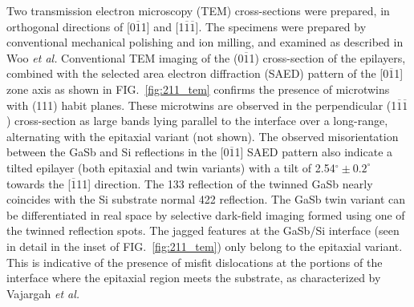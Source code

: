 Two transmission electron microscopy (TEM) cross-sections were prepared, in orthogonal directions of [0$\overline{1}$1] and [1$\overline{1}\overline{1}$]. The specimens were prepared by conventional mechanical polishing and ion milling, and examined as described in Woo \textit{et al.}\cite{Woo2012} Conventional TEM imaging of the (0$\overline{1}$1) cross-section of the epilayers, combined with the selected area electron diffraction (SAED) pattern of the [0$\overline{1}$1] zone axis as shown in FIG.~\ref{fig:211_tem} confirms the presence of microtwins with (111) habit planes. These microtwins are observed in the perpendicular (1$\overline{1}\overline{1}$) cross-section as large bands lying parallel to the interface over a long-range, alternating with the epitaxial variant (not shown). The observed misorientation between the GaSb and Si reflections in the [0$\overline{1}$1] SAED pattern also indicate a tilted epilayer (both epitaxial and twin variants) with a tilt of 2.54$^\circ \pm 0.2^\circ$ towards the [$\overline{1}$11] direction. The 133 reflection of the twinned GaSb nearly coincides with the Si substrate normal 422 reflection. The GaSb twin variant can be differentiated in real space by selective dark-field imaging formed using one of the twinned reflection spots. The jagged features at the GaSb/Si interface (seen in detail in the inset of FIG.~\ref{fig:211_tem}) only belong to the epitaxial variant. This is indicative of the presence of misfit dislocations at the portions of the interface where the epitaxial region meets the substrate, as characterized by Vajargah \textit{et al.}\cite{Vajargah2011b}
